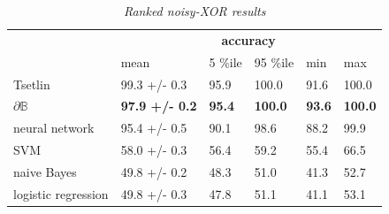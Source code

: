 \documentclass{article} %
\begin{document}
\begin{table}[h]
	\centering
	\begin{tabular}{llllll}
		\cline{2-6}
		\multicolumn{1}{c}{}                       & \multicolumn{5}{c}{\textbf{accuracy}}                                                                                                                                                            \\ \cline{2-6} 
		\multicolumn{1}{l|}{}                      & \multicolumn{1}{l|}{mean}                  & \multicolumn{1}{l|}{5 \%ile}       & \multicolumn{1}{l|}{95 \%ile}       & \multicolumn{1}{l|}{min}           & \multicolumn{1}{l|}{max}            \\ \hline
		\multicolumn{1}{|l|}{Tsetlin}              & \multicolumn{1}{l|}{99.3 +/- 0.3}          & \multicolumn{1}{l|}{95.9}          & \multicolumn{1}{l|}{100.0}          & \multicolumn{1}{l|}{91.6}          & \multicolumn{1}{l|}{100.0}          \\ \hline
		\multicolumn{1}{|l|}{$\partial\mathbb{B}$} & \multicolumn{1}{l|}{\textbf{97.9 +/- 0.2}} & \multicolumn{1}{l|}{\textbf{95.4}} & \multicolumn{1}{l|}{\textbf{100.0}} & \multicolumn{1}{l|}{\textbf{93.6}} & \multicolumn{1}{l|}{\textbf{100.0}} \\ \hline
		\multicolumn{1}{|l|}{neural network}       & \multicolumn{1}{l|}{95.4 +/- 0.5}          & \multicolumn{1}{l|}{90.1}          & \multicolumn{1}{l|}{98.6}           & \multicolumn{1}{l|}{88.2}          & \multicolumn{1}{l|}{99.9}           \\ \hline
		\multicolumn{1}{|l|}{SVM}                  & \multicolumn{1}{l|}{58.0 +/- 0.3}          & \multicolumn{1}{l|}{56.4}          & \multicolumn{1}{l|}{59.2}           & \multicolumn{1}{l|}{55.4}          & \multicolumn{1}{l|}{66.5}           \\ \hline
		\multicolumn{1}{|l|}{naive Bayes}          & \multicolumn{1}{l|}{49.8 +/- 0.2}          & \multicolumn{1}{l|}{48.3}          & \multicolumn{1}{l|}{51.0}           & \multicolumn{1}{l|}{41.3}          & \multicolumn{1}{l|}{52.7}           \\ \hline
		\multicolumn{1}{|l|}{logistic regression}  & \multicolumn{1}{l|}{49.8 +/- 0.3}          & \multicolumn{1}{l|}{47.8}          & \multicolumn{1}{l|}{51.1}           & \multicolumn{1}{l|}{41.1}          & \multicolumn{1}{l|}{53.1}           \\ \hline
	\end{tabular}
	\caption{{\em Ranked noisy-XOR results}}
	\label{tab:noisy-xor-results}
\end{table}
\end{document}
